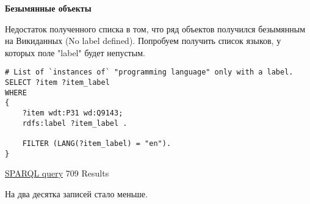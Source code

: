 \textbf{Безымянные объекты}

Недостаток полученного списка в том, что ряд объектов получился безымянным на Викиданных (No label defined). Попробуем получить список языков, у которых поле "label" будет непустым.

\begin{lstlisting}[language=SPARQL]
# List of `instances of` "programming language" only with a label.
SELECT ?item ?item_label
WHERE
{
    ?item wdt:P31 wd:Q9143; 
    rdfs:label ?item_label . 

    FILTER (LANG(?item_label) = "en").
}
\end{lstlisting}

\href{https://query.wikidata.org/#%23List%20of%20%60instances%20of%60%20%22programming%20language%22%20only%20with%20a%20label.%0ASELECT%20%3Fitem%20%3Fitem_label%0AWHERE%0A%7B%0A%20%20%20%20%3Fitem%20wdt%3AP31%20wd%3AQ9143%0A%20%20%20%20%3B%20rdfs%3Alabel%20%3Fitem_label%20.%20%0A%0A%20%20%20%20FILTER%20%28LANG%28%3Fitem_label%29%20%3D%20%22en%22%29%20.%20%0A%7D}{SPARQL query} 709 Results

На два десятка записей стало меньше.
